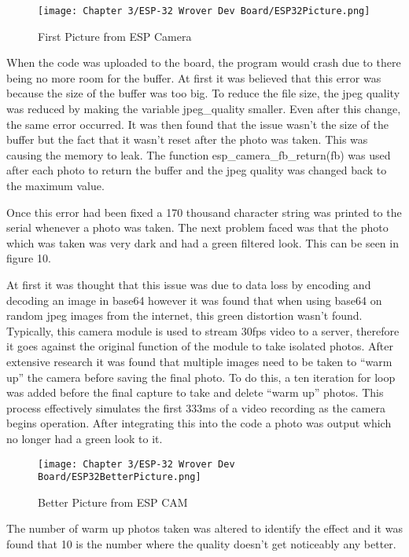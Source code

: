 \begin{figure}[H]        
    \centering
    \texttt{[image: Chapter 3/ESP-32 Wrover Dev Board/ESP32Picture.png]}
    \caption{First Picture from ESP Camera}
    \label{fig:espcamfp}
\end{figure} 

When the code was uploaded to the board, the program would crash due to there being no more room for the buffer.
At first it was believed that this error was because the size of the buffer was too big.
To reduce the file size, the jpeg quality was reduced by making the variable jpeg\_quality smaller.
Even after this change, the same error occurred.
It was then found that the issue wasn't the size of the buffer but the fact that it wasn't reset after the photo was taken.
This was causing the memory to leak.
The function esp\_camera\_fb\_return(fb) was used after each photo to return the buffer and the jpeg quality was changed back to the maximum value.

Once this error had been fixed a 170 thousand character string was printed to the serial whenever a photo was taken.
The next problem faced was that the photo which was taken was very dark and had a green filtered look.
This can be seen in figure 10.

At first it was thought that this issue was due to data loss by encoding and decoding an image in base64 however it was found that when using base64 on random jpeg images from the internet, this green distortion wasn't found.
Typically, this camera module is used to stream 30fps video to a server, therefore it goes against the original function of the module to take isolated photos.
After extensive research it was found that multiple images need to be taken to “warm up” the camera before saving the final photo.
To do this, a ten iteration for loop was added before the final capture to take and delete “warm up” photos.
This process effectively simulates the first 333ms of a video recording as the camera begins operation.
After integrating this into the code a photo was output which no longer had a green look to it.

\begin{figure}[H]        
    \centering
    \texttt{[image: Chapter 3/ESP-32 Wrover Dev Board/ESP32BetterPicture.png]}
    \caption{Better Picture from ESP CAM}
    \label{fig:espcambetterpic}
\end{figure} 

The number of warm up photos taken was altered to identify the effect and it was found that 10 is the number where the quality doesn't get noticeably any better.

